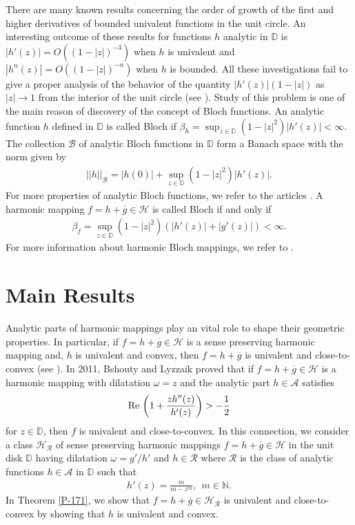 \documentclass[a4paper,12pt]{amsart}
\theoremstyle{definition}
\newcounter {own}
\begin{document}
	There are many known results concerning the order of growth of the first and higher derivatives of bounded univalent functions in the unit circle. An interesting outcome of these results for functions $h$ analytic in $\mathbb{D}$ is $|h'(z)| = O((1-|z|)^{-3})$ when $h$ is univalent and $|h^{n}(z )|=O((1-|z|)^{-n})$ when $h$ is bounded. All these investigations fail to give a proper analysis of the behavior of the quantity $|h'(z)|(1-|z|)$ as $|z|\rightarrow 1$ from the interior of the unit circle (see \cite{Seidel-Walsh-1942}). Study of this problem is one of the main reason of discovery of the concept of Bloch functions. An analytic function $h$  defined in $\mathbb{D}$ is called Bloch if $\beta_h=\sup_{z\in\mathbb{D}}(1-|z|^2)|h'(z)|<\infty.$	The collection $\mathcal{B}$ of analytic Bloch functions in $\mathbb{D}$ form a Banach space with the norm given by
	\begin{align*}
		||h||_{\mathcal{B}}=|h(0)|+\sup_{z\in\mathbb{D}}(1-|z|^2)|h'(z)|.
	\end{align*} 
	For more properties of analytic Bloch functions, we refer to the articles \cite{Pommerenke-1970, Anderson-Clunie-Pommerenke-1974,  Anderson-Shields-1976, Bonk-1991, Bonk-Minda-Yanagihara-1996}. A harmonic mapping $f=h+\overline{g}\in\mathcal{H}$ is called Bloch if and only if
	\begin{align*}
		\beta_f=\sup_{z\in\mathbb{D}}(1-|z|^2)(|h'(z)|+|g'(z)|)<\infty.
	\end{align*}
	For more information about harmonic Bloch mappings, we refer to \cite{Chen-Gauthier-Hengartner-2000, Colonna-1989}.
	
	
	
	\section{Main Results}\label{Sect-2}
	Analytic parts of harmonic mappings play an vital role to shape their geometric properties. In particular, if $f=h+\overline{g}\in\mathcal{H}$ is a sense preserving harmonic mapping and, $h$ is univalent and convex, then $f=h+\overline{g}$ is univalent and close-to-convex (see \cite{Clunie-Small-1984}). In 2011, Bshouty and Lyzzaik \cite{Bshouty-Lyzzaik-2011} proved that if $f=h+\overline{g}\in\mathcal{H}$ is a harmonic mapping with dilatation $\omega=z$ and the analytic part $h \in \mathcal{A}$ satisfies $${\rm Re\,}\left(1+\frac{zh''(z)}{h'(z)}\right)>-\frac{1}{2}$$ for $z\in\mathbb{D}$, then $f$ is univalent and close-to-convex. In this connection, we consider a class $\mathcal{H_R}$ of sense preserving harmonic mappings $f=h+\overline{g}\in\mathcal{H}$ in the unit disk $\mathbb{D}$ having dilatation $\omega=g'/h'$ and $h\in\mathcal{R}$ where $\mathcal{R}$ is the class of analytic functions $h\in\mathcal{A}$ in $\mathbb{D}$ such that 
	\begin{align*}
		h'(z)=\frac{m}{m-z^m},~~m\in\mathbb{N}.
	\end{align*}
In Theorem \ref{P-171}, we show that $f=h+\overline{g}\in\mathcal{H_R}$ is univalent and close-to-convex by showing that $h$ is univalent and convex. 
\end{document}
